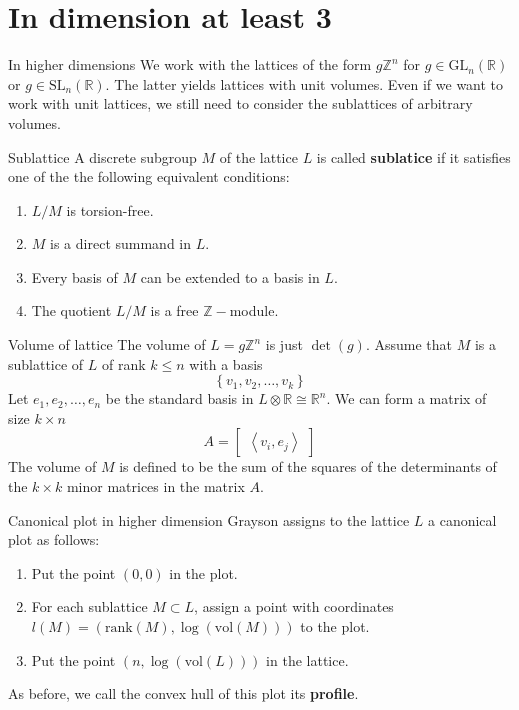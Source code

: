 \documentclass[pdf]{beamer}
\begin{document}
\section{In dimension at least 3}
\begin{frame}{In higher dimensions}
    We work with the lattices of the form $g\mathbb{Z}^n$ for $g \in \text{GL}_n(\mathbb{R})$ or
    $g \in \text{SL}_n(\mathbb{R})$. The latter yields lattices with unit volumes. Even if we want to work with unit lattices,
    we still need to consider the sublattices of arbitrary volumes.
    \pause
    \begin{block}{Sublattice}
        A discrete subgroup $M$ of the lattice $L$ is called \textbf{sublatice} if it satisfies one of the
        the following equivalent conditions:
        \begin{enumerate}
            \item $L/M$ is torsion-free.
            \item $M$ is a direct summand in $L$.
            \item Every basis of $M$ can be extended to a basis in $L$.
            \item The quotient $L/M$ is a free $\mathbb{Z}-$module.
        \end{enumerate}
    \end{block}
\end{frame}
\begin{frame}{Volume of lattice}
    The volume of $L = g\mathbb{Z}^n$ is just $\det(g)$. Assume that $M$ is a sublattice of $L$ of rank $k \le n$
    with a basis
    \[\left\lbrace v_1, v_2,\ldots, v_k\right\rbrace\]
    Let $e_1,e_2,\ldots,e_n$ be the standard basis in $L \otimes \mathbb{R} \cong \mathbb{R}^n$. We can form a matrix of size $k \times n$
    \[A = \begin{bmatrix}
            \left\langle v_i ,e_j\right\rangle
        \end{bmatrix}\]
    The volume of $M$ is defined to be the sum of the squares of the determinants of the $k \times k$ minor matrices in the matrix $A$.
\end{frame}
\begin{frame}{Canonical plot in higher dimension}
    Grayson assigns to the lattice $L$ a canonical plot as follows:
    \begin{enumerate}
        \item Put the point $(0,0)$ in the plot.
        \item For each sublattice $M \subset L$, assign a point with coordinates ${l}(M) = (\text{rank}(M), \log(\text{vol}(M)))$ to the plot.
        \item Put the point $(n, \log(\text{vol}(L)))$ in the lattice.
    \end{enumerate} \pause

    As before, we call the convex hull of this plot its \textbf{profile}.
\end{frame}
\end{document}
